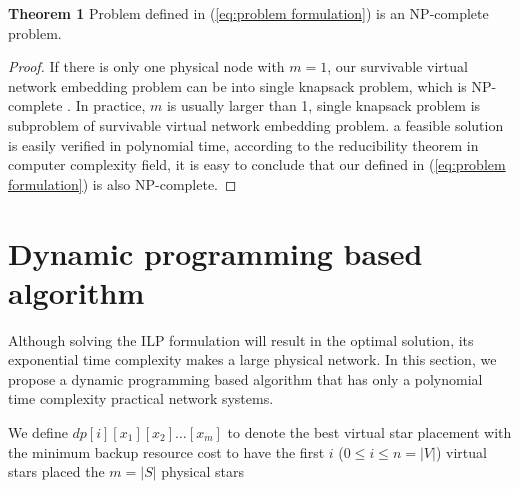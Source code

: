 \textbf{Theorem 1} Problem defined in (\ref{eq:problem formulation}) is an NP-complete problem.
\begin{proof}
If  there is only one physical node with $m=1$, our survivable virtual network embedding problem can be   into  single knapsack problem, which is NP-complete . In practice, $m$ is usually larger than 1,  single knapsack problem is  subproblem of survivable virtual network embedding problem.   a feasible solution is easily verified in polynomial time, according to the reducibility theorem\cite{wood1987theory} in computer complexity field, it is easy to conclude that our defined in (\ref{eq:problem formulation}) is also NP-complete.
\end{proof}

\section{Dynamic programming based algorithm}
\label{lab:DynamicProgrammingEquation}

Although solving the ILP formulation will result in the optimal solution, its exponential time complexity makes  a large  physical network. In this section, we propose a dynamic programming based algorithm that has only a polynomial time complexity  practical network systems.


We define  $dp[i][{x_1}][{x_2}] \ldots [{x_m}]$ to denote the best virtual star placement with the minimum backup resource cost to have the first $i$ ($0 \le i \le n=|V| $) virtual stars placed  the $m=|S|$ physical stars 

